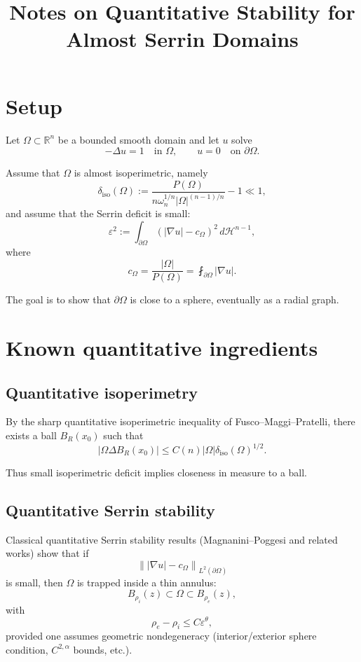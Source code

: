 \documentclass[11pt]{article}
\title{Notes on Quantitative Stability for Almost Serrin Domains}
\author{}
\date{}
\newcommand{\eps}{\varepsilon}
\newcommand{\deliso}{\delta_{\mathrm{iso}}}
\begin{document}
\maketitle

\section{Setup}

Let $\Omega \subset \mathbb R^n$ be a bounded smooth domain and let
$u$ solve
\[
-\Delta u = 1 \quad \text{in }\Omega,
\qquad
u=0 \quad \text{on }\partial\Omega.
\]

Assume that $\Omega$ is almost isoperimetric, namely
\[
\deliso(\Omega)
:=
\frac{P(\Omega)}
{n\omega_n^{1/n}|\Omega|^{(n-1)/n}}
-1
\ll 1,
\]
and assume that the Serrin deficit is small:
\[
\eps^2
:=
\int_{\partial\Omega}
\left(
|\nabla u|-c_\Omega
\right)^2
\,d\mathcal H^{n-1},
\]
where
\[
c_\Omega
=
\frac{|\Omega|}{P(\Omega)}
=
\fint_{\partial\Omega} |\nabla u|.
\]

The goal is to show that $\partial\Omega$ is close to a sphere,
eventually as a radial graph.

\section{Known quantitative ingredients}

\subsection{Quantitative isoperimetry}

By the sharp quantitative isoperimetric inequality of
Fusco--Maggi--Pratelli,
there exists a ball $B_R(x_0)$ such that
\[
|\Omega \Delta B_R(x_0)|
\le
C(n)|\Omega|\deliso(\Omega)^{1/2}.
\]

Thus small isoperimetric deficit implies closeness in measure to a ball.

\subsection{Quantitative Serrin stability}

Classical quantitative Serrin stability results
(Magnanini--Poggesi and related works)
show that if
\[
\left\|
|\nabla u|-c_\Omega
\right\|_{L^2(\partial\Omega)}
\]
is small, then $\Omega$ is trapped inside a thin annulus:
\[
B_{\rho_i}(z)\subset \Omega \subset B_{\rho_e}(z),
\]
with
\[
\rho_e-\rho_i
\le
C \eps^\theta,
\]
provided one assumes geometric nondegeneracy
(interior/exterior sphere condition, $C^{2,\alpha}$ bounds, etc.).
\end{document}
